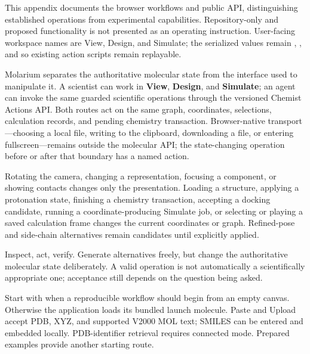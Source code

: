 \documentclass[11pt]{article}
\begin{document}
This appendix documents the browser workflows and public API, distinguishing established operations from experimental capabilities. Repository-only and proposed functionality is not presented as an operating instruction. User-facing workspace names are View, Design, and Simulate; the serialized values remain , , and  so existing action scripts remain replayable.


Molarium separates the authoritative molecular state from the interface used to manipulate it. A scientist can work in \textbf{View}, \textbf{Design}, and \textbf{Simulate}; an agent can invoke the same guarded scientific operations through the versioned Chemist Actions API. Both routes act on the same graph, coordinates, selections, calculation records, and pending chemistry transaction. Browser-native transport---choosing a local file, writing to the clipboard, downloading a file, or entering fullscreen---remains outside the molecular API; the state-changing operation before or after that boundary has a named action.

Rotating the camera, changing a representation, focusing a component, or showing contacts changes only the presentation. Loading a structure, applying a protonation state, finishing a chemistry transaction, accepting a docking candidate, running a coordinate-producing Simulate job, or selecting or playing a saved calculation frame changes the current coordinates or graph. Refined-pose and side-chain alternatives remain candidates until explicitly applied.

Inspect, act, verify. Generate alternatives freely, but change the authoritative molecular state deliberately. A valid operation is not automatically a scientifically appropriate one; acceptance still depends on the question being asked.


Start with  when a reproducible workflow should begin from an empty canvas. Otherwise the application loads its bundled launch molecule. Paste and Upload accept PDB, XYZ, and supported V2000 MOL text; SMILES can be entered and embedded locally. PDB-identifier retrieval requires connected mode. Prepared examples provide another starting route.
\end{document}
